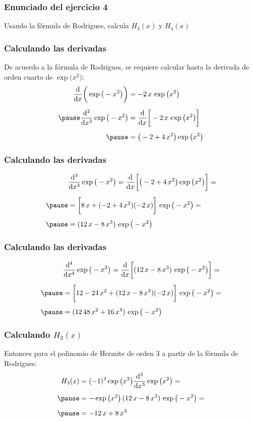 \documentclass[12pt]{beamer}
\begin{document}
\begin{frame}
\frametitle{Enunciado del ejercicio 4}
Usando la fórmula de Rodrigues, calcula $H_{3} (x)$ y $H_{4} (x)$
\end{frame}
\begin{frame}
\frametitle{Calculando las derivadas}
De acuerdo a la fórmula de Rodrigues, \pause se requiere calcular hasta la derivada de orden cuarto de $\exp\big( x^{2} \big)$:
\pause
\begin{eqnarray*}
\begin{aligned}
\dv{x} \bigg( \exp\big( - x^{2} \big) \bigg) &= - 2 \, x \, \exp\big( x^{2} \big) \\[0.5em] \pause
\dv[2]{x} \exp\big( - x^{2} \big) &= \dv{x} \bigg[ - 2 \, x \, \exp\big( x^{2} \big) \bigg] \\[0.5em] \pause
&= \big( -2 + 4 \, x^{2} \big) \exp\big( x^{2} \big)
\end{aligned}
\end{eqnarray*}
\end{frame}
\begin{frame}
\frametitle{Calculando las derivadas}
\begin{eqnarray*}
\begin{aligned}
&\dv[3]{x} \exp\big( - x^{2} \big) = \dv{x} \bigg[ \big( -2 + 4 \, x^{2} \big) \exp\big( x^{2} \big) \bigg] = \\[0.5em] \pause
&= \bigg[ 8 \, x + (-2 + 4 \, x^{2})(- 2 \, x) \bigg] \, \exp\big( - x^{2} \big) = \\[0.5em] \pause
&= (12 \, x - 8 \, x^{3}) \, \exp\big( - x^{2} \big)
\end{aligned}
\end{eqnarray*}
\end{frame}
\begin{frame}
\frametitle{Calculando las derivadas}
\begin{eqnarray*}
\begin{aligned}
&\dv[4]{x} \exp\big( - x^{2} \big) = \dv{x} \bigg[ (12 \, x - 8 \, x^{3}) \, \exp\big( - x^{2} \big) \bigg] = \\[0.5em] \pause
&= \bigg[ 12 - 24 \, x^{2} + (12 \, x - 8 \, x^{3}) (-2 \, x) \bigg] \, \exp\big( - x^{2} \big) = \\[0.5em] \pause
&= (12 \, 48 \, x^{2} + 16 \, x^{4}) \, \exp\big( - x^{2} \big)
\end{aligned}
\end{eqnarray*}
\end{frame}
\begin{frame}
\frametitle{Calculando $H_{3} (x)$}
Entonces para el polinomio de Hermite de orden 3 a partir de la fórmula de Rodrigues:
\pause
\begin{eqnarray*}
\begin{aligned}
H_{3} (x) &= (-1)^{3} \exp\big( x^{2} \big) \dv[3]{x} \exp\big( x^{2} \big) = \\[0.5em] \pause
&= - \exp\big( x^{2} \big) \, (12 \, x - 8 \, x^{3}) \, \exp\big( - x^{2} \big) = \\[0.5em] \pause
&= - 12 \, x + 8 \, x^{3}
\end{aligned}
\end{eqnarray*}
\end{frame}
\end{document}
